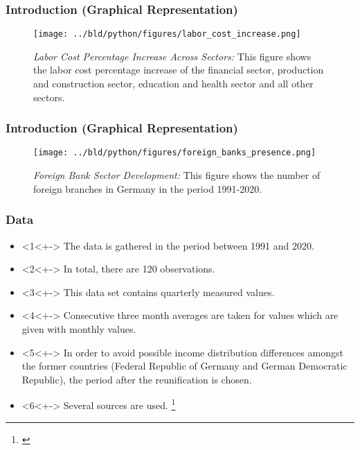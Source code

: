 \documentclass[11pt]{beamer}
\begin{document}
\begin{frame}
\frametitle{Introduction (Graphical Representation)}
    \begin{figure}

        \centering
        \texttt{[image: ../bld/python/figures/labor\_cost\_increase.png]}

        \caption{\emph{Labor Cost Percentage Increase Across Sectors:} This figure shows the labor cost percentage increase of the financial sector, production and construction sector, education and health sector and all other sectors.}
        \label{fig:labor}

    \end{figure}
\end{frame}

\begin{frame}
\frametitle{Introduction (Graphical Representation)}
    \begin{figure}

        \centering
        \texttt{[image: ../bld/python/figures/foreign\_banks\_presence.png]}

        \caption{\emph{Foreign Bank Sector Development:} This figure shows the number of foreign branches in Germany in the period 1991-2020.}
        \label{fig:foreign_banks_sector}

    \end{figure}
\end{frame}

\begin{frame}
\frametitle{Data}
\begin{itemize}
\item<1<+-> The data is gathered in the period between 1991 and 2020.
\item<2<+-> In total, there are 120 observations.
\item<3<+-> This data set contains quarterly measured values.
\item<4<+-> Consecutive three month averages are taken for values which are given with monthly values.
\item<5<+-> In order to avoid possible income distribution differences amongst the former countries (Federal Republic of Germany and German Democratic Republic), the period after the reunification is chosen.
\item<6<+-> Several sources are used. \footnote{\cite{DeutscheBundesbank,Eurostat,EuropeanCentralBank}}
\end{itemize}
\end{frame}
\end{document}
